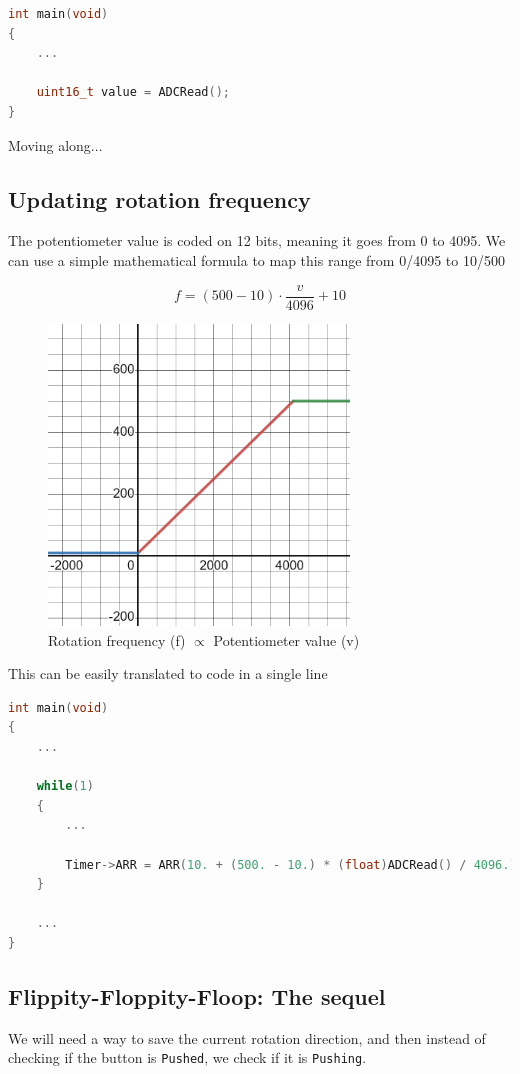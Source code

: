 \documentclass{article}
\begin{document}
\begin{lstlisting}[language=C++]
int main(void)
{
    ...
    
    uint16_t value = ADCRead();
}
\end{lstlisting}

Moving along...

\subsection{Updating rotation frequency}

The potentiometer value is coded on 12 bits, meaning it goes from 0 to 4095. We can use a simple mathematical formula to map this range from 0/4095 to 10/500

$$
f = (500 - 10) \cdot \frac{v}{4096} + 10
$$

\begin{figure}[H]
    \includegraphics[width=8cm]{assets/desmos-graph.png}
    \centering
    \caption{Rotation frequency (f) $\propto$ Potentiometer value (v)}
\end{figure}

This can be easily translated to code in a single line

\begin{lstlisting}[language=C++, caption={f $\propto$ v}]
int main(void)
{
    ...

    while(1)
    {
        ...
        
        Timer->ARR = ARR(10. + (500. - 10.) * (float)ADCRead() / 4096.);
    }

    ...
}
\end{lstlisting}


\subsection{Flippity-Floppity-Floop: The sequel}
We will need a way to save the current rotation direction, and then instead of checking if the button is \verb|Pushed|, we check if it is \verb|Pushing|.
\end{document}
